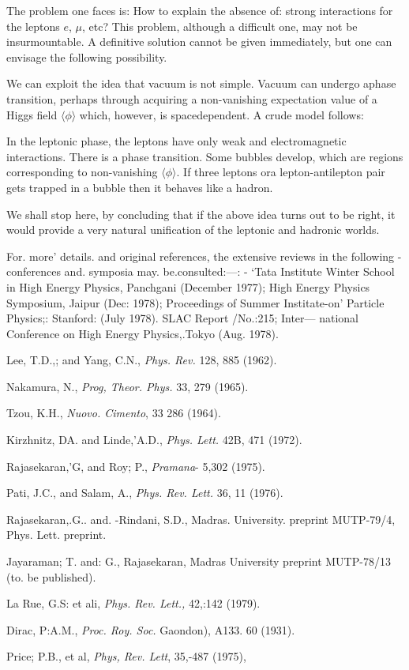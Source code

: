 The problem one faces is: How to explain the absence of: strong
interactions for the leptons $e$, $\mu$, etc? This problem, although a difficult
one, may not be insurmountable. A definitive solution cannot be given
immediately, but one can envisage the following possibility. 

We can exploit the idea that vacuum is not simple. Vacuum can
undergo aphase transition, perhaps through acquiring a non-vanishing
expectation value of a Higgs field $\langle \phi \rangle$ which, however, is spacedependent. A crude model follows:

In the leptonic phase, the leptons have only weak and electromagnetic
interactions. There is a phase transition. Some bubbles develop, which
are regions corresponding to non-vanishing $\langle \phi \rangle$. If three leptons ora
lepton-antilepton pair gets trapped in a bubble then it behaves like a
hadron.  

We shall stop here, by concluding that if the above idea turns out to be
right, it would provide a very natural unification of the leptonic and hadronic worlds. 

\begin{thebibliography}{99}
\bibitem{} For. more’ details. and original references, the extensive reviews in the following
- conferences and. symposia may. be.consulted:—:
- ‘Tata Institute Winter School in High Energy Physics, Panchgani (December 1977);
High Energy Physics Symposium, Jaipur (Dec: 1978); Proceedings of Summer
Institate-on' Particle Physics;: Stanford: (July 1978). SLAC Report /No.:215; Inter---
national Conference on High Energy Physics,.Tokyo (Aug. 1978).

\bibitem{} Lee, T.D.,; and Yang, C.N., {\it Phys. Rev.} 128, 885 (1962).

Nakamura, N., {\it Prog, Theor. Phys.} 33, 279 (1965).

Tzou, K.H., {\it Nuovo. Cimento}, 33 286 (1964).  

\bibitem{} Kirzhnitz, DA. and Linde,’A.D., {\it Phys. Lett.} 42B, 471 (1972). 

\bibitem{} Rajasekaran,'G, and Roy; P., {\it Pramana}- 5,302 (1975).

Pati, J.C., and Salam, A., {\it Phys. Rev. Lett.} 36, 11 (1976).

\bibitem{} Rajasekaran,.G.. and. -Rindani, S.D., Madras. University. preprint MUTP-79/4,
Phys. Lett. preprint.   

Jayaraman; T. and: G., Rajasekaran, Madras University preprint MUTP-78/13
(to. be published). 

\bibitem{} La Rue, G.S: et ali, {\it Phys. Rev. Lett.,} 42,:142 (1979).

\bibitem{} Dirac, P:A.M., {\it Proc. Roy. Soc.} Gaondon), A133. 60 (1931). 

\bibitem{} Price; P.B., et al, {\it Phys, Rev. Lett}, 35,-487 (1975),    
\end{thebibliography}


